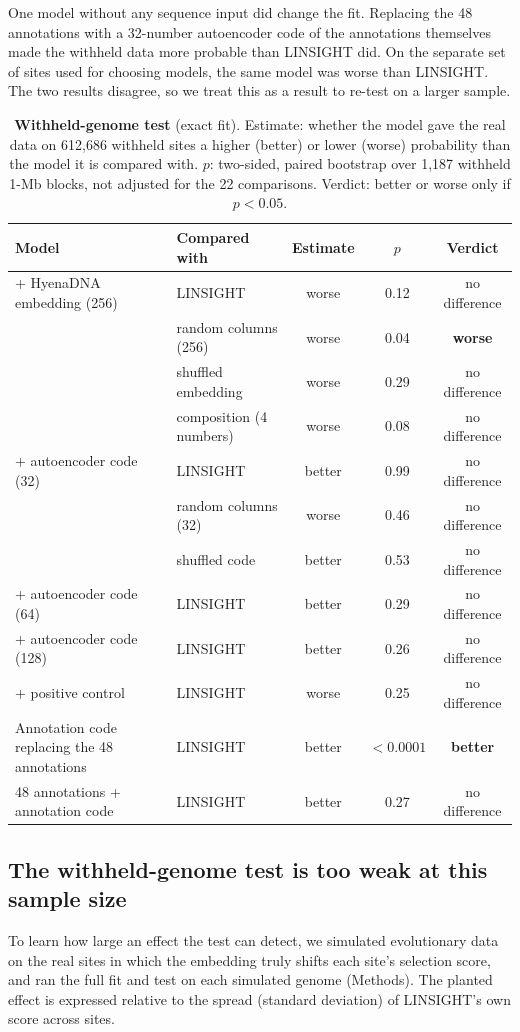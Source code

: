 \documentclass[11pt]{article}
\begin{document}
One model without any sequence input did change the fit. Replacing the 48 annotations with a 32-number
autoencoder code of the annotations themselves made the withheld data more probable than LINSIGHT
did. On the separate set of sites used for choosing models, the same model was worse than LINSIGHT.
The two results disagree, so we treat this as a result to re-test on a larger sample.

\begin{table}[t]
\centering\small
\caption{\textbf{Withheld-genome test} (exact fit). Estimate: whether the model gave the real data on
612,686 withheld sites a higher (better) or lower (worse) probability than the model it is compared
with. $p$: two-sided, paired bootstrap over 1,187 withheld 1-Mb blocks, not adjusted for the 22
comparisons. Verdict: better or worse only if $p<0.05$.}
\label{tab:heldout}\setlength{\tabcolsep}{5pt}
\begin{tabular}{@{}llccc@{}}
\toprule
Model & Compared with & Estimate & $p$ & Verdict \\
\midrule
+ HyenaDNA embedding (256) & LINSIGHT & worse & 0.12 & no difference \\
 & random columns (256) & worse & 0.04 & \textbf{worse} \\
 & shuffled embedding & worse & 0.29 & no difference \\
 & composition (4 numbers) & worse & 0.08 & no difference \\
+ autoencoder code (32) & LINSIGHT & better & 0.99 & no difference \\
 & random columns (32) & worse & 0.46 & no difference \\
 & shuffled code & better & 0.53 & no difference \\
+ autoencoder code (64) & LINSIGHT & better & 0.29 & no difference \\
+ autoencoder code (128) & LINSIGHT & better & 0.26 & no difference \\
+ positive control & LINSIGHT & worse & 0.25 & no difference \\
\midrule
Annotation code replacing the 48 annotations & LINSIGHT & better & $<0.0001$ & \textbf{better} \\
48 annotations + annotation code & LINSIGHT & better & 0.27 & no difference \\
\bottomrule
\end{tabular}
\end{table}

\subsection*{The withheld-genome test is too weak at this sample size}
To learn how large an effect the test can detect, we simulated evolutionary data on the real sites in
which the embedding truly shifts each site's selection score, and ran the full fit and test on each
simulated genome (Methods). The planted effect is expressed relative to the spread (standard deviation)
of LINSIGHT's own score across sites.
\end{document}

